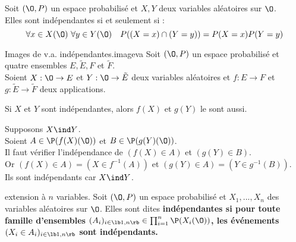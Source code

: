 \documentclass[11pt]{article}
\begin{document}
\begin{prop}{}{}
    Soit $(\O,P)$ un espace probabilisé et $X,Y$ deux variables aléatoires sur $\O$.\\
    Elles sont indépendantes si et seulement si :
    \begin{equation*}
        \forall x \in X(\O) ~ \forall y \in Y(\O) \quad P((X=x)\cap(Y=y))=P(X=x)P(Y=y)
    \end{equation*}
\end{prop}

\begin{prop}{Images de v.a. indépendantes.}{imageva}
    Soit $(\O,P)$ un espace probabilisé et quatre ensembles $E,\tilde{E},F$ et $\tilde{F}$.\\
    Soient $X:\O\to E$ et $Y:\O\to\tilde{E}$ deux variables aléatoires et $f:E\to F$ et $g:\tilde{E}\to\tilde{F}$ deux applications.
    \begin{center}
        Si $X$ et $Y$ sont indépendantes, alors $f(X)$ et $g(Y)$ le sont aussi.
    \end{center}
    \tcblower
    Supposons $X \ind Y$.\\
    Soient $A\in\P(f(X)(\O))$ et $B\in\P(g(Y)(\O))$.\\
    Il faut vérifier l'indépendance de $(f(X)\in A)$ et $(g(Y)\in B)$.\\
    Or $(f(X)\in A) = (X\in f^{-1}(A))$ et $(g(Y)\in A)=(Y\in g^{-1}(B))$.\\
    Ils sont indépendants car $X\ind Y$. 
\end{prop}

\begin{defi}{extension à $n$ variables.}{}
    Soit $(\O,P)$ un espace probabilisé et $X_1,...,X_n$ des variables aléatoires sur $\O$. Elles sont dites \bf{indépendantes} si pour toute famille d'ensembles $(A_i)_{i\in\lb1,n\rb}\in\prod_{i=1}^n\P(X_i(\O))$, les événements $(X_i\in A_i)_{i\in\lb1,n\rb}$ sont indépendants.
\end{defi}
\end{document}
